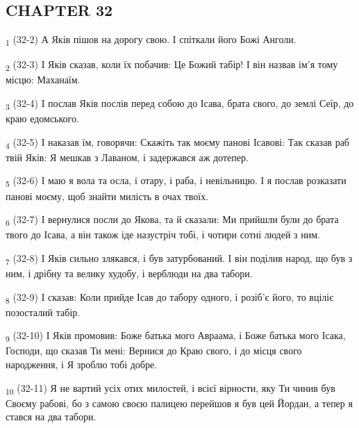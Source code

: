\subsection{CHAPTER 32}
\begin{tcolorbox}
\textsubscript{1} (32-2) А Яків пішов на дорогу свою. І спіткали його Божі Анголи.
\end{tcolorbox}
\begin{tcolorbox}
\textsubscript{2} (32-3) І Яків сказав, коли їх побачив: Це Божий табір! І він назвав ім'я тому місцю: Маханаїм.
\end{tcolorbox}
\begin{tcolorbox}
\textsubscript{3} (32-4) І послав Яків послів перед собою до Ісава, брата свого, до землі Сеїр, до краю едомського.
\end{tcolorbox}
\begin{tcolorbox}
\textsubscript{4} (32-5) І наказав їм, говорячи: Скажіть так моєму панові Ісавові: Так сказав раб твій Яків: Я мешкав з Лаваном, і задержався аж дотепер.
\end{tcolorbox}
\begin{tcolorbox}
\textsubscript{5} (32-6) І маю я вола та осла, і отару, і раба, і невільницю. І я послав розказати панові моєму, щоб знайти милість в очах твоїх.
\end{tcolorbox}
\begin{tcolorbox}
\textsubscript{6} (32-7) І вернулися посли до Якова, та й сказали: Ми прийшли були до брата твого до Ісава, а він також іде назустріч тобі, і чотири сотні людей з ним.
\end{tcolorbox}
\begin{tcolorbox}
\textsubscript{7} (32-8) І Яків сильно злякався, і був затурбований. І він поділив народ, що був з ним, і дрібну та велику худобу, і верблюди на два табори.
\end{tcolorbox}
\begin{tcolorbox}
\textsubscript{8} (32-9) І сказав: Коли прийде Ісав до табору одного, і розіб'є його, то вціліє позосталий табір.
\end{tcolorbox}
\begin{tcolorbox}
\textsubscript{9} (32-10) І Яків промовив: Боже батька мого Авраама, і Боже батька мого Ісака, Господи, що сказав Ти мені: Вернися до Краю свого, і до місця свого народження, і Я зроблю тобі добре.
\end{tcolorbox}
\begin{tcolorbox}
\textsubscript{10} (32-11) Я не вартий усіх отих милостей, і всієї вірности, яку Ти чинив був Своєму рабові, бо з самою своєю палицею перейшов я був цей Йордан, а тепер я стався на два табори.
\end{tcolorbox}
